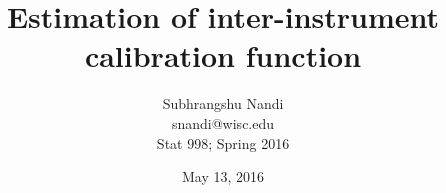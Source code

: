 \documentclass[12pt]{article}
\begin{document}
\title{Estimation of inter-instrument calibration function}

\author{Subhrangshu Nandi \\
	snandi@wisc.edu \\	
	Stat 998; Spring 2016}
\date{May 13, 2016}

\maketitle






%


%
\end{document}
